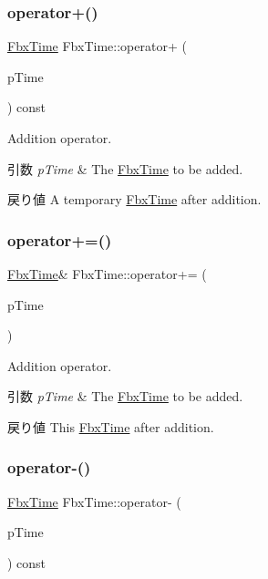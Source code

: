 \subsubsection{\texorpdfstring{operator+()}{operator+()}}
{\footnotesize\ttfamily \hyperlink{class_fbx_time}{Fbx\+Time} Fbx\+Time\+::operator+ (\begin{DoxyParamCaption}\item[{const \hyperlink{class_fbx_time}{Fbx\+Time} \&}]{p\+Time }\end{DoxyParamCaption}) const}

Addition operator. 
\begin{DoxyParams}{引数}
{\em p\+Time} & The \hyperlink{class_fbx_time}{Fbx\+Time} to be added. \\
\hline
\end{DoxyParams}
\begin{DoxyReturn}{戻り値}
A temporary \hyperlink{class_fbx_time}{Fbx\+Time} after addition. 
\end{DoxyReturn}
\mbox{\label{class_fbx_time_ac65f799bcf861bc3ace76e7feabd6043}} 
\subsubsection{\texorpdfstring{operator+=()}{operator+=()}}
{\footnotesize\ttfamily \hyperlink{class_fbx_time}{Fbx\+Time}\& Fbx\+Time\+::operator+= (\begin{DoxyParamCaption}\item[{const \hyperlink{class_fbx_time}{Fbx\+Time} \&}]{p\+Time }\end{DoxyParamCaption})}

Addition operator. 
\begin{DoxyParams}{引数}
{\em p\+Time} & The \hyperlink{class_fbx_time}{Fbx\+Time} to be added. \\
\hline
\end{DoxyParams}
\begin{DoxyReturn}{戻り値}
This \hyperlink{class_fbx_time}{Fbx\+Time} after addition. 
\end{DoxyReturn}
\mbox{\label{class_fbx_time_aea722074dbc93c423fa5b83420f87611}} 
\subsubsection{\texorpdfstring{operator-\/()}{operator-()}}
{\footnotesize\ttfamily \hyperlink{class_fbx_time}{Fbx\+Time} Fbx\+Time\+::operator-\/ (\begin{DoxyParamCaption}\item[{const \hyperlink{class_fbx_time}{Fbx\+Time} \&}]{p\+Time }\end{DoxyParamCaption}) const}

